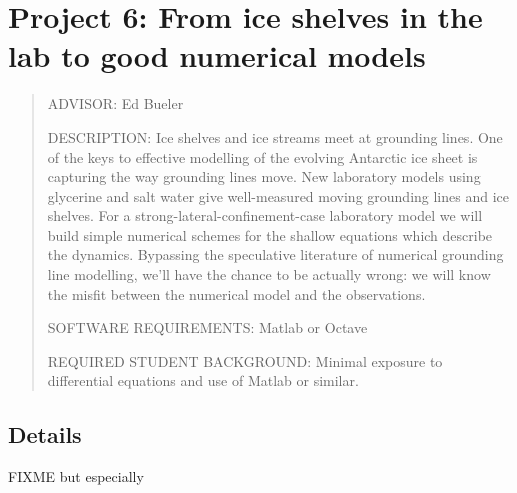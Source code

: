 \documentclass[11pt,final]{amsart}%
\begin{document}
\bigskip\bigskip
\section*{Project 6: From ice shelves in the lab to good numerical models}

\begin{quote}
\noindent ADVISOR: Ed Bueler

\medskip
\noindent DESCRIPTION:  Ice shelves and ice streams meet at grounding lines.  One of the keys to effective modelling of the evolving Antarctic ice sheet is capturing the way grounding lines move.  New laboratory models using glycerine and salt water give well-measured moving grounding lines and ice shelves.  For a strong-lateral-confinement-case laboratory model \citep{Pegleretal2013} we will build simple numerical schemes for the shallow equations which describe the dynamics.  Bypassing the speculative literature of numerical grounding line modelling, we'll have the chance to be actually wrong: we will know the misfit between the numerical model and the observations.

\medskip
\noindent SOFTWARE REQUIREMENTS: Matlab or Octave

\medskip
\noindent REQUIRED STUDENT BACKGROUND: Minimal exposure to differential equations and use of Matlab or similar.
\end{quote}

\subsection*{Details} FIXME  \cite{PeglerListerWorster2012,PeglerWorster2012,SayagPeglerWorster2012} but especially \cite{Pegleretal2013}

\small

\normalsize
\end{document}

